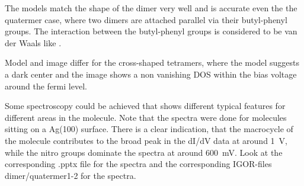 \label{sec:single-TBP-Ag100}

% 


The models match the shape of the dimer very well and is accurate even the the quatermer case, where two dimers are attached parallel via their butyl-phenyl groups. The interaction between the butyl-phenyl groups is considered to be van der Waals like \cite{iacovita_controlling_2012}.

Model and image differ for the cross-shaped tetramers, where the model suggests a dark center and the image shows a non vanishing DOS within the bias voltage around the fermi level.

Some spectroscopy could be achieved that shows different typical features for different areas in the molecule. Note that the spectra were done for molecules sitting on a Ag(100) surface.
There is a clear indication, that the macrocycle of the molecule contributes to the broad peak in the dI/dV data at around \SI{1}{\V}, while the nitro groups dominate the spectra at around \SI{600}{\milli \V}. 
Look at the corresponding .pptx file for the spectra and the corresponding IGOR-files dimer/quatermer1-2 for the spectra.

